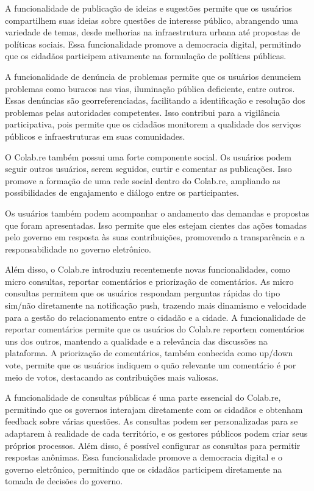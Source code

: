 A funcionalidade de publicação de ideias e sugestões permite que os usuários compartilhem suas ideias sobre questões de interesse público, abrangendo uma variedade de temas, desde melhorias na infraestrutura urbana até propostas de políticas sociais. Essa funcionalidade promove a democracia digital, permitindo que os cidadãos participem ativamente na formulação de políticas públicas.

A funcionalidade de denúncia de problemas permite que os usuários denunciem problemas como buracos nas vias, iluminação pública deficiente, entre outros. Essas denúncias são georreferenciadas, facilitando a identificação e resolução dos problemas pelas autoridades competentes. Isso contribui para a vigilância participativa, pois permite que os cidadãos monitorem a qualidade dos serviços públicos e infraestruturas em suas comunidades.

O Colab.re também possui uma forte componente social. Os usuários podem seguir outros usuários, serem seguidos, curtir e comentar as publicações. Isso promove a formação de uma rede social dentro do Colab.re, ampliando as possibilidades de engajamento e diálogo entre os participantes.

Os usuários também podem acompanhar o andamento das demandas e propostas que foram apresentadas. Isso permite que eles estejam cientes das ações tomadas pelo governo em resposta às suas contribuições, promovendo a transparência e a responsabilidade no governo eletrônico.

Além disso, o Colab.re introduziu recentemente novas funcionalidades, como micro consultas, reportar comentários e priorização de comentários. As micro consultas permitem que os usuários respondam perguntas rápidas do tipo sim/não diretamente na notificação push, trazendo mais dinamismo e velocidade para a gestão do relacionamento entre o cidadão e a cidade. A funcionalidade de reportar comentários permite que os usuários do Colab.re reportem comentários uns dos outros, mantendo a qualidade e a relevância das discussões na plataforma. A priorização de comentários, também conhecida como up/down vote, permite que os usuários indiquem o quão relevante um comentário é por meio de votos, destacando as contribuições mais valiosas.

A funcionalidade de consultas públicas é uma parte essencial do Colab.re, permitindo que os governos interajam diretamente com os cidadãos e obtenham feedback sobre várias questões. As consultas podem ser personalizadas para se adaptarem à realidade de cada território, e os gestores públicos podem criar seus próprios processos. Além disso, é possível configurar as consultas para permitir respostas anônimas. Essa funcionalidade promove a democracia digital e o governo eletrônico, permitindo que os cidadãos participem diretamente na tomada de decisões do governo.

